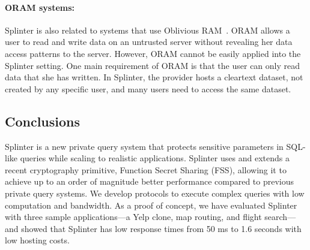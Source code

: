 \paragraph{ORAM systems:}
Splinter is also related to systems that use Oblivious RAM~\cite{stefanov:path-oram, lorch2013shroud}. 
ORAM allows a user to read and write data on an untrusted server without
revealing her data access patterns to the server. However, ORAM cannot be easily applied
into the Splinter setting. One main requirement of ORAM is that the user
can only read data that she has written. 
In Splinter, the provider hosts a cleartext dataset, not created by any specific user, 
and many users need to access the same dataset.

\subsection{Conclusions}
\label{spl-sec:conclusion}
Splinter is a new private query system that protects sensitive parameters
in SQL-like queries while scaling to realistic applications. Splinter uses and extends a recent
cryptography primitive, Function Secret Sharing (FSS),
allowing it to achieve up to an order of magnitude better
performance compared to previous private query systems. We develop
protocols to execute complex queries
with low computation and bandwidth. As a proof of concept,
we have evaluated Splinter with three sample applications---a Yelp clone,
map routing, and flight search---and showed
that Splinter has low response times from 50 ms to 1.6 seconds with low
hosting costs.
